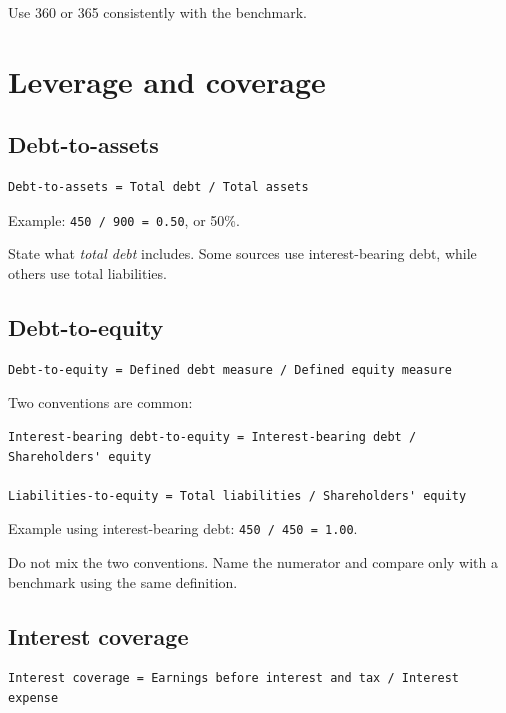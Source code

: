 \documentclass[11pt,letterpaper,oneside,openany]{book}
\begin{document}
Use 360 or 365 consistently with the benchmark.


\section[Leverage and coverage]{Leverage and coverage}
\subsection[Debt-to-assets]{Debt-to-assets}
\begin{Verbatim}[fontsize=\small,breaklines=true,breakanywhere=true,frame=single,framesep=2mm]
Debt-to-assets = Total debt / Total assets
\end{Verbatim}

Example: \texttt{450 / 900 = 0.50}, or 50\%.


State what \emph{total debt} includes. Some sources use interest-bearing debt, while others use total liabilities.


\subsection[Debt-to-equity]{Debt-to-equity}
\begin{Verbatim}[fontsize=\small,breaklines=true,breakanywhere=true,frame=single,framesep=2mm]
Debt-to-equity = Defined debt measure / Defined equity measure
\end{Verbatim}

Two conventions are common:


\begin{Verbatim}[fontsize=\small,breaklines=true,breakanywhere=true,frame=single,framesep=2mm]
Interest-bearing debt-to-equity = Interest-bearing debt / Shareholders' equity

Liabilities-to-equity = Total liabilities / Shareholders' equity
\end{Verbatim}

Example using interest-bearing debt: \texttt{450 / 450 = 1.00}.


Do not mix the two conventions. Name the numerator and compare only with a benchmark using the same definition.


\subsection[Interest coverage]{Interest coverage}
\begin{Verbatim}[fontsize=\small,breaklines=true,breakanywhere=true,frame=single,framesep=2mm]
Interest coverage = Earnings before interest and tax / Interest expense
\end{Verbatim}
\end{document}
